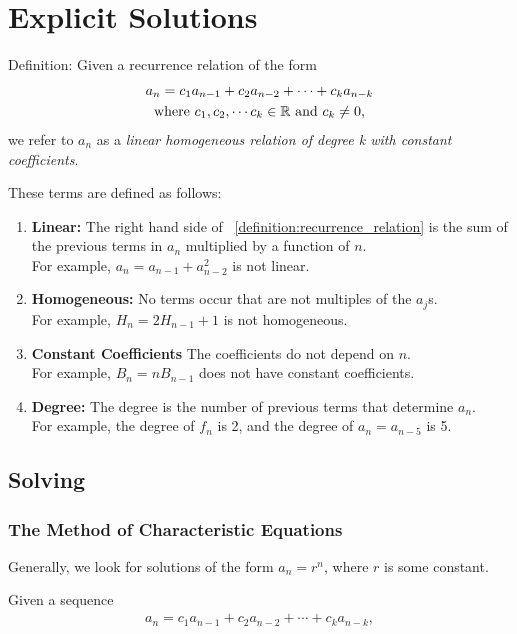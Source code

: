 \documentclass[a4paper,10pt]{report}
\begin{document}
\section{Explicit Solutions}
Definition: Given a recurrence relation of the form
\begin{gather}\label{definition:recurrence_relation}
	a_n = c_1a_{n-1} + c_2a_{n-2} + \cdots + c_ka_{n-k} \\
	\text{where } c_1, c_2, \cdots c_k \in \mathbb{R} \text{ and } c_k \neq 0, \notag
\end{gather}
we refer to $a_n$ as a \textit{linear homogeneous relation of degree k with constant coefficients}.

These terms are defined as follows:
\begin{enumerate}
	\item \textbf{Linear: }
		The right hand side of ~\ref{definition:recurrence_relation} is the sum of the previous terms in $a_n$ multiplied by a function of $n$. \\
		For example, $a_n = a_{n-1} + a_{n-2}^2$ is not linear.
	\item \textbf{Homogeneous: }
		No terms occur that are not multiples of the $a_j$s. 				\\ %
		For example, $H_n = 2H_{n-1} + 1$ is not homogeneous.
	\item \textbf{Constant Coefficients}
		The coefficients do not depend on $n$.								\\
		For example, $B_n = nB_{n-1}$ does not have constant coefficients.
	\item \textbf{Degree: }
		The degree is the number of previous terms that determine $a_n$.	\\
		For example, the degree of $f_n$ is 2, and the degree of $a_n = a_{n-5}$ is 5.
\end{enumerate}

\subsection{Solving}
\subsubsection{The Method of Characteristic Equations}
	Generally, we look for solutions of the form $a_n = r^n$, where $r$ is some constant.

	Given a sequence
	\begin{gather*}
		a_n = c_1a_{n-1} + c_2a_{n-2} + \cdots +c_ka_{n-k},
	\end{gather*}
\end{document}
